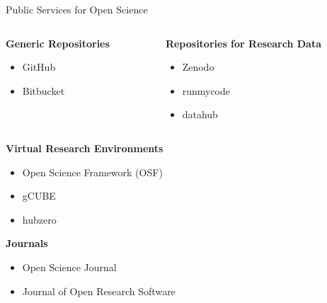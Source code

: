 \documentclass{intbeamer}
\begin{document}
\begin{frame}{Public Services for Open Science}

\begin{columns}[T]
\begin{column}{.45\linewidth}
\textbf{Generic Repositories}
\begin{itemize}
\item GitHub
\item Bitbucket
\end{itemize}
\end{column}
%
\begin{column}{.45\linewidth}
\textbf{Repositories for Research Data}
\begin{itemize}
\item Zenodo
\item runmycode
\item datahub
\end{itemize}
\end{column}
\end{columns}

\vfill

\textbf{Virtual Research Environments}
\begin{itemize}
\item Open Science Framework (OSF)
\item gCUBE
\item hubzero
\end{itemize}

\vfill

\textbf{Journals}
\begin{itemize}
\item Open Science Journal
\item Journal of Open Research Software
\end{itemize}

\end{frame}
\end{document}
